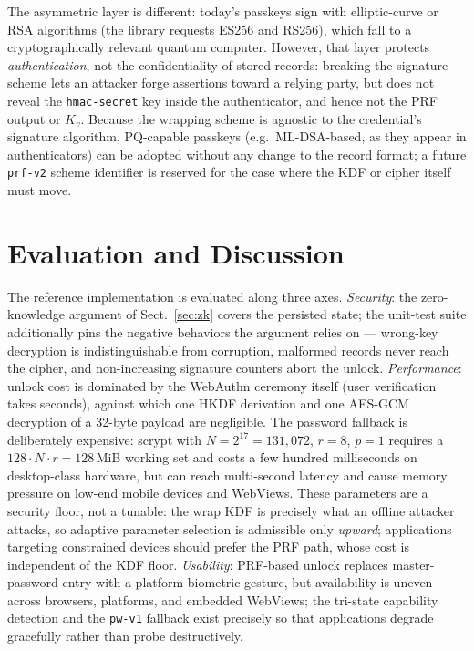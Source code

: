 \documentclass[runningheads]{llncs}
\begin{document}
The asymmetric layer is different: today's passkeys sign with elliptic-curve or RSA algorithms (the library requests ES256 and RS256), which fall to a cryptographically relevant quantum computer.
However, that layer protects \emph{authentication}, not the confidentiality of stored records: breaking the signature scheme lets an attacker forge assertions toward a relying party, but does not reveal the \texttt{hmac-secret} key inside the authenticator, and hence not the PRF output or $K_v$.
Because the wrapping scheme is agnostic to the credential's signature algorithm, PQ-capable passkeys (e.g.\ ML-DSA-based, as they appear in authenticators) can be adopted without any change to the record format; a future \texttt{prf-v2} scheme identifier is reserved for the case where the KDF or cipher itself must move.

\section{Evaluation and Discussion}
The reference implementation is evaluated along three axes.
\emph{Security}: the zero-knowledge argument of Sect.~\ref{sec:zk} covers the persisted state; the unit-test suite additionally pins the negative behaviors the argument relies on --- wrong-key decryption is indistinguishable from corruption, malformed records never reach the cipher, and non-increasing signature counters abort the unlock.
\emph{Performance}: unlock cost is dominated by the WebAuthn ceremony itself (user verification takes seconds), against which one HKDF derivation and one AES-GCM decryption of a 32-byte payload are negligible.
The password fallback is deliberately expensive: scrypt with $N{=}2^{17}{=}131{,}072$, $r{=}8$, $p{=}1$ requires a $128 \cdot N \cdot r = 128$\,MiB working set and costs a few hundred milliseconds on desktop-class hardware, but can reach multi-second latency and cause memory pressure on low-end mobile devices and WebViews.
These parameters are a security floor, not a tunable: the wrap KDF is precisely what an offline attacker attacks, so adaptive parameter selection is admissible only \emph{upward}; applications targeting constrained devices should prefer the PRF path, whose cost is independent of the KDF floor.
\emph{Usability}: PRF-based unlock replaces master-password entry with a platform biometric gesture, but availability is uneven across browsers, platforms, and embedded WebViews; the tri-state capability detection and the \texttt{pw-v1} fallback exist precisely so that applications degrade gracefully rather than probe destructively.
\end{document}
